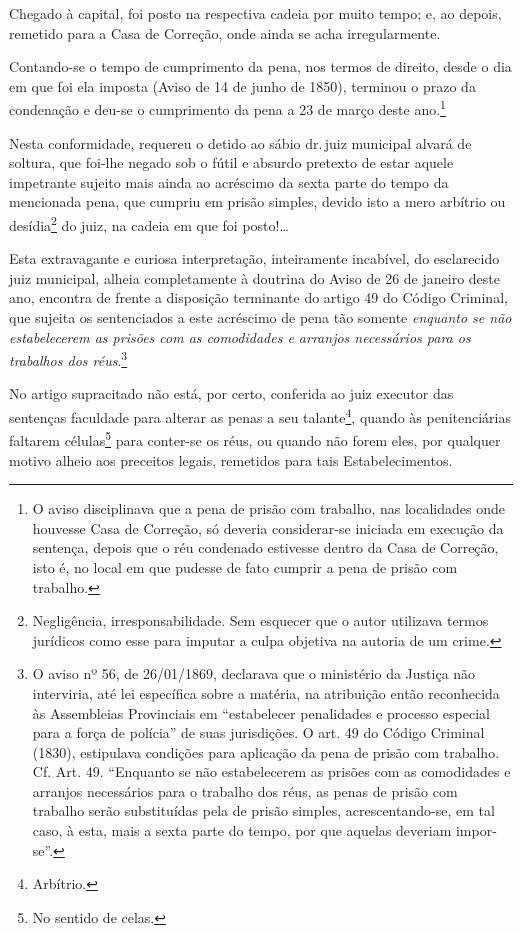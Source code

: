 Chegado à capital, foi posto na respectiva cadeia por muito tempo; e, ao
depois, remetido para a Casa de Correção, onde ainda se acha
irregularmente.

Contando-se o tempo de cumprimento da pena, nos termos de direito, desde
o dia em que foi ela imposta (Aviso de 14 de junho de 1850), terminou o
prazo da condenação e deu-se o cumprimento da pena a 23 de março deste
ano.\footnote{O aviso disciplinava que a pena de prisão com trabalho,
  nas localidades onde houvesse Casa de Correção, só deveria
  considerar-se iniciada em execução da sentença, depois que o réu
  condenado estivesse dentro da Casa de Correção, isto é, no local em
  que pudesse de fato cumprir a pena de prisão com trabalho.}

Nesta conformidade, requereu o detido ao sábio dr.\,juiz municipal alvará
de soltura, que foi-lhe negado sob o fútil e absurdo pretexto de estar
aquele impetrante sujeito mais ainda ao acréscimo da sexta parte do
tempo da mencionada pena, que cumpriu em prisão simples, devido isto a
mero arbítrio ou desídia\footnote{Negligência, irresponsabilidade. Sem
  esquecer que o autor utilizava termos jurídicos como esse para imputar
  a culpa objetiva na autoria de um crime.} do juiz, na cadeia em que
foi posto!\ldots{}

Esta extravagante e curiosa interpretação, inteiramente incabível, do
esclarecido juiz municipal, alheia completamente à doutrina do Aviso de
26 de janeiro deste ano, encontra de frente a disposição terminante do
artigo 49 do Código Criminal, que sujeita os sentenciados a este
acréscimo de pena tão somente \emph{enquanto se não estabelecerem as
prisões com as comodidades e arranjos necessários para os trabalhos dos
réus}.\footnote{O aviso nº 56, de 26/01/1869, declarava que o
  ministério da Justiça não interviria, até lei específica sobre a
  matéria, na atribuição então reconhecida às Assembleias Provinciais em
  ``estabelecer penalidades e processo especial para a força de polícia''
  de suas jurisdições. O art. 49 do Código Criminal (1830), estipulava
  condições para aplicação da pena de prisão com trabalho. Cf. Art. 49.
  ``Enquanto se não estabelecerem as prisões com as comodidades e
  arranjos necessários para o trabalho dos réus, as penas de prisão com
  trabalho serão substituídas pela de prisão simples, acrescentando-se,
  em tal caso, à esta, mais a sexta parte do tempo, por que aquelas
  deveriam impor-se''.}

No artigo supracitado não está, por certo, conferida ao juiz executor
das sentenças faculdade para alterar as penas a seu talante\footnote{
  Arbítrio.}, quando às penitenciárias faltarem células\footnote{No
  sentido de celas.} para conter-se os réus, ou quando não forem eles,
por qualquer motivo alheio aos preceitos legais, remetidos para tais
Estabelecimentos.

